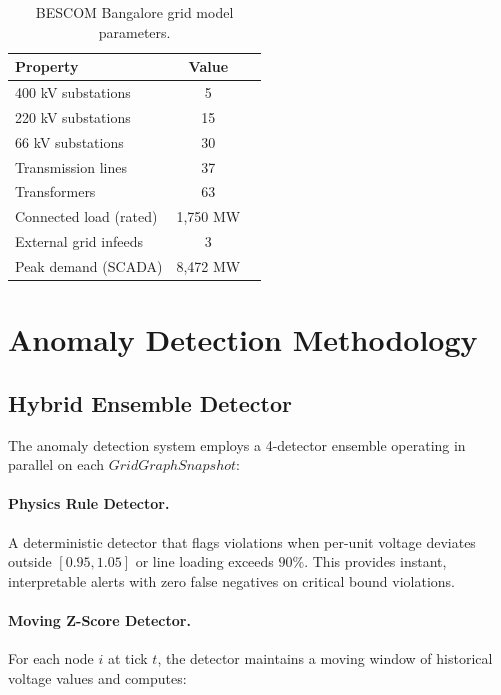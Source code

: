 \documentclass[conference]{IEEEtran}
\begin{document}
\begin{table}[h]
  \centering
  \caption{BESCOM Bangalore grid model parameters.}
  \label{tab:bescom}
  \begin{tabular}{lcc}
  \toprule
  Property & Value \\
  \midrule
  400 kV substations & 5 \\
  220 kV substations & 15 \\
  66 kV substations & 30 \\
  Transmission lines & 37 \\
  Transformers & 63 \\
  Connected load (rated) & 1,750 MW \\
  External grid infeeds & 3 \\
  Peak demand (SCADA) & 8,472 MW \\
  \bottomrule
  \end{tabular}
\end{table}

\section{Anomaly Detection Methodology}
\label{sec:methods}

\subsection{Hybrid Ensemble Detector}

The anomaly detection system employs a 4-detector ensemble operating in parallel on each $GridGraphSnapshot$:

\paragraph{Physics Rule Detector.}
A deterministic detector that flags violations when per-unit voltage deviates outside $[0.95, 1.05]$ or line loading exceeds $90\%$. This provides instant, interpretable alerts with zero false negatives on critical bound violations.

\paragraph{Moving Z-Score Detector.}
For each node $i$ at tick $t$, the detector maintains a moving window of historical voltage values and computes:
\end{document}
